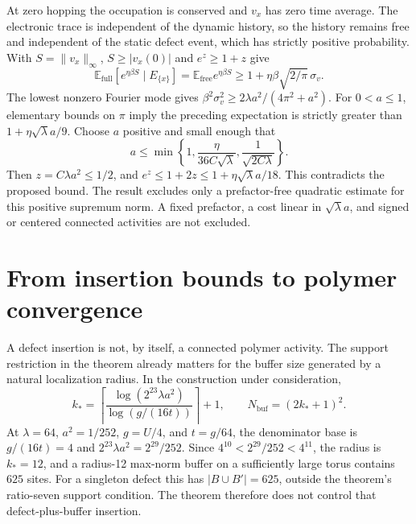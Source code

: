\documentclass[11pt]{article}
\theoremstyle{remark}
\newcommand{\E}{\mathbb{E}}
\newcommand{\free}{\mathrm{free}}
\newcommand{\full}{\mathrm{full}}
\begin{document}
At zero hopping the occupation is conserved and $v_x$ has zero time average. The electronic trace is independent of the dynamic history, so the history remains free and independent of the static defect event, which has strictly positive probability. With $S=\|v_x\|_\infty$, $S\ge|v_x(0)|$ and $e^z\ge1+z$ give
\[
 \E_{\full}[e^{\eta\beta S}\mid E_{\{x\}}]
 =\E_{\free}e^{\eta\beta S}
 \ge1+\eta\beta\sqrt{2/\pi}\,\sigma_v.
\]
The lowest nonzero Fourier mode gives $\beta^2\sigma_v^2\ge2\lambda a^2/(4\pi^2+a^2)$. For $0<a\le1$, elementary bounds on $\pi$ imply the preceding expectation is strictly greater than $1+\eta\sqrt\lambda a/9$. Choose $a$ positive and small enough that
\[
 a\le\min\left\{1,\frac{\eta}{36C\sqrt\lambda},\frac1{\sqrt{2C\lambda}}\right\}.
\]
Then $z=C\lambda a^2\le1/2$, and $e^z\le1+2z\le1+\eta\sqrt\lambda a/18$. This contradicts the proposed bound. The result excludes only a prefactor-free quadratic estimate for this positive supremum norm. A fixed prefactor, a cost linear in $\sqrt\lambda a$, and signed or centered connected activities are not excluded.

\section{From insertion bounds to polymer convergence}

A defect insertion is not, by itself, a connected polymer activity. The support restriction in the theorem already matters for the buffer size generated by a natural localization radius. In the construction under consideration,
\[
 k_* = \left\lceil\frac{\log(2^{23}\lambda a^2)}{\log(g/(16t))}\right\rceil+1,
 \qquad N_{\mathrm{buf}}=(2k_*+1)^2.
\]
At $\lambda=64$, $a^2=1/252$, $g=U/4$, and $t=g/64$, the denominator base is $g/(16t)=4$ and $2^{23}\lambda a^2=2^{29}/252$. Since $4^{10}<2^{29}/252<4^{11}$, the radius is $k_*=12$, and a radius-12 max-norm buffer on a sufficiently large torus contains $625$ sites. For a singleton defect this has $|B\cup B'|=625$, outside the theorem's ratio-seven support condition. The theorem therefore does not control that defect-plus-buffer insertion.
\end{document}
